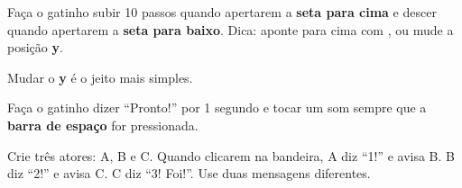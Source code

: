 \begin{exercicio}
Faça o gatinho subir 10 passos quando apertarem a \textbf{seta para cima} e descer quando apertarem a \textbf{seta para baixo}. Dica: aponte para cima com , ou mude a posição \textbf{y}.
\end{exercicio}

\begin{solucao}
Mudar o \textbf{y} é o jeito mais simples.
\begin{pilha}
\end{pilha}
\begin{pilha}
\end{pilha}
\end{solucao}

\begin{exercicio}
Faça o gatinho dizer ``Pronto!'' por 1 segundo e tocar um som sempre que a \textbf{barra de espaço} for pressionada.
\end{exercicio}

\begin{solucao}
\begin{pilha}
\end{pilha}
\end{solucao}

\begin{desafio}
Crie três atores: A, B e C. Quando clicarem na bandeira, A diz ``1!'' e avisa B. B diz ``2!'' e avisa C. C diz ``3! Foi!''. Use duas mensagens diferentes.
\end{desafio}

\begin{solucao}
\begin{pilha}
\end{pilha}
\begin{pilha}
\end{pilha}
\begin{pilha}
\end{pilha}
\end{solucao}
